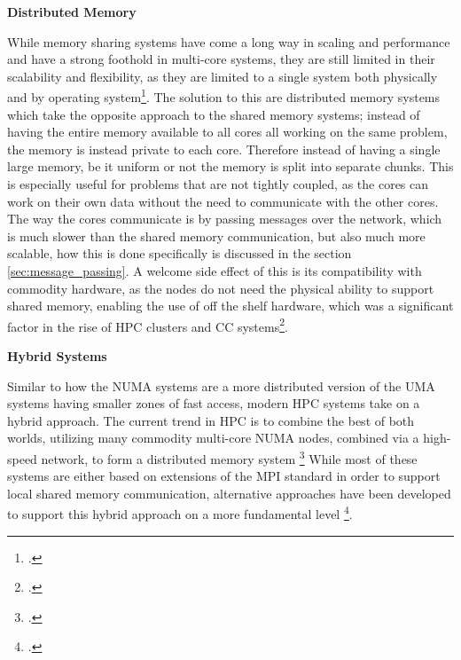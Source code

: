 

\textbf{Distributed Memory}

While memory sharing systems have come a long way in scaling and performance and have a strong foothold in multi-core systems,
they are still limited in their scalability and flexibility, as they are limited to a single system both physically and by operating system\footcite{hpcwikiParallelProgramming}.
The solution to this are distributed memory systems which take the opposite approach to the shared memory systems; instead of having the entire memory available to all cores all
working on the same problem, the memory is instead private to each core. Therefore instead of having a single large memory, be it uniform or not the memory is split into separate chunks.
This is especially useful for problems that are not tightly coupled, as the cores can work on their own data without the need to communicate with the other cores.
The way the cores communicate is by passing messages over the network, which is much slower than the shared memory communication, but also much more scalable, how this
is done specifically is discussed in the section \ref{sec:message_passing}.
A welcome side effect of this is its compatibility with commodity hardware, as the nodes do not need the physical ability to support shared memory,
enabling the use of off the shelf hardware, which was a significant factor in the rise of \ac{HPC} clusters and \ac{CC} systems\footcite{dongarraHighperformanceComputingClusters2005}.



\textbf{Hybrid Systems}

Similar to how the \ac{NUMA} systems are a more distributed version of the \ac{UMA} systems having smaller zones of fast access,
modern \ac{HPC} systems take on a hybrid approach.
The current trend in \ac{HPC} is to combine the best of both worlds, utilizing many commodity multi-core \ac{NUMA} nodes,
combined via a high-speed network, to form a distributed memory system \footcite{rabenseifnerHybridMPIOpenMP2009}
While most of these systems are either based on extensions of the \ac{MPI} standard in order to support
local shared memory communication, alternative approaches have been developed to support this hybrid approach
on a more fundamental level \footcite{jinHighPerformanceComputing2011}.

